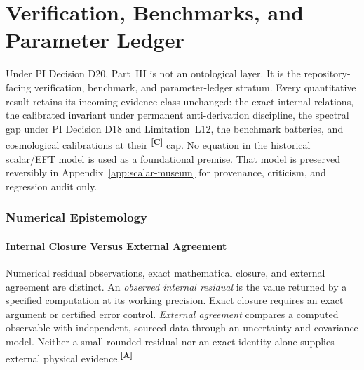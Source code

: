 \documentclass[12pt,a4paper,twoside]{article}
\theoremstyle{plain}
\theoremstyle{definition}
\theoremstyle{remark}
\newcommand{\catmark}[1]{\textsuperscript{\textsf{\textbf{[#1]}}}}
\begin{document}


\newpage
\part{Verification, Benchmarks, and Parameter Ledger}
\label{part:effective-field}

\noindent Under PI Decision D20, Part~III is not an ontological layer. It is
the repository-facing verification, benchmark, and parameter-ledger stratum.
Every quantitative result retains its incoming evidence class unchanged: the
exact internal relations, the calibrated invariant under permanent
anti-derivation discipline, the spectral gap under PI Decision D18 and
Limitation~L12, the benchmark batteries, and cosmological calibrations at
their \catmark{C} cap. No equation in the historical scalar/EFT model is used
as a foundational premise. That model is preserved reversibly in
Appendix~\ref{app:scalar-museum} for provenance, criticism, and regression
audit only.



\newpage
\section{Numerical Epistemology}
\label{sec:numerical-epistemology}

\subsection{Internal Closure Versus External Agreement}
\label{subsec:closure-vs-agreement}

Numerical residual observations, exact mathematical closure, and external
agreement are distinct. An \emph{observed internal residual} is the value
returned by a specified computation at its working precision. Exact closure
requires an exact argument or certified error control. \emph{External
agreement} compares a computed observable with independent, sourced data
through an uncertainty and covariance model. Neither a small rounded residual
nor an exact identity alone supplies external physical evidence.\catmark{A}
\end{document}
